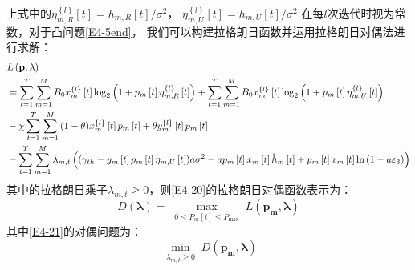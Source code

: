 上式中的$\eta_{m,R}^{\left\{ l \right\}}\left[t\right]=h_{m,R}\left[t\right]/{\sigma^2}$，
$\eta_{m,U}^{\left\{ l \right\}}\left[t\right]=h_{m,U}\left[t\right]/{\sigma^2}$
在每$l$次迭代时视为常数，对于凸问题\eqref{E4-5end}，
我们可以构建拉格朗日函数并运用拉格朗日对偶法进行求解：
\begin{align}\label{E4-20}
&L\left(\mathbf{p},\lambda\right)\\
&=\sum_{t=1}^T \sum_{m=1}^M {B}_{0}x_{m}^{\left\{ l \right\}}\left[ t \right] %
\log_2{\left(1+p_m\left[t\right]\eta_{m,R}^{\left\{ l \right\}}\left[t\right]\right)}+                                                      \notag
\sum_{t=1}^T \sum_{m=1}^M {B}_{0}x_{m}^{\left\{ l \right\}}\left[ t \right]
\log_2{\left(1+p_m\left[t\right]\eta_{m,U}^{\left\{ l \right\}}\left[t\right]\right)}                     \\                                \notag
&-\chi \sum_{t=1}^T \sum_{m=1}^M{(1-\theta)x_{m}^{\left\{ l \right\}}\left[ t \right]p_m\left[t\right]
+\theta y_{m}^{\left\{ l \right\}}\left[ t \right]p_m\left[t\right]} \\
&-\sum\limits_{t=1}^{T}{\sum\limits_{m=1}^{M}{{{\lambda }_{m,t}}}}\left( ({{\gamma }_{th}}-{{y}_{m}}\left[ t \right]{{p}_{m}}\left[ t \right]{{\eta }_{m,U}}\left[ t \right])a{{\sigma }^{2}}-a{{p}_{m}}\left[ t \right]{{x}_{m}}\left[ t \right]{{{\hat{h}}}_{m}}\left[ t \right]+{{p}_{m}}\left[ t \right]{{x}_{m}}\left[ t \right]\ln \left( 1-a{{\varepsilon }_{3}} \right) \right)                                                                 \notag
\end{align}
其中的拉格朗日乘子$\lambda_{m,t}\geq 0$，则\eqref{E4-20}的拉格朗日对偶函数表示为：
\begin{equation} \label{E4-21}
D(\mathbf{\lambda})=\max _{\substack{0 \leq P_m[t] \leq P_{\max }}} L\left(\mathbf{p_m},\mathbf{\lambda}\right)
\end{equation}
其中\eqref{E4-21}的对偶问题为：
\begin{equation} \label{E4-22}
\min_{\substack{\lambda_{m,t}\geq 0}} D\left(\mathbf{p_m},\mathbf{\lambda}\right)
\end{equation}
